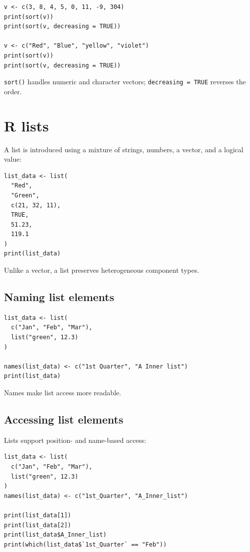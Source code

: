 \begin{lstlisting}[style=dsr]
v <- c(3, 8, 4, 5, 0, 11, -9, 304)
print(sort(v))
print(sort(v, decreasing = TRUE))

v <- c("Red", "Blue", "yellow", "violet")
print(sort(v))
print(sort(v, decreasing = TRUE))
\end{lstlisting}

\texttt{sort()} handles numeric and character vectors; \texttt{decreasing = TRUE} reverses the order.

\section{R lists}

A list is introduced using a mixture of strings, numbers, a vector, and a logical value:

\begin{lstlisting}[style=dsr]
list_data <- list(
  "Red",
  "Green",
  c(21, 32, 11),
  TRUE,
  51.23,
  119.1
)
print(list_data)
\end{lstlisting}

Unlike a vector, a list preserves heterogeneous component types.

\subsection{Naming list elements}

\begin{lstlisting}[style=dsr]
list_data <- list(
  c("Jan", "Feb", "Mar"),
  list("green", 12.3)
)

names(list_data) <- c("1st Quarter", "A Inner list")
print(list_data)
\end{lstlisting}

Names make list access more readable.

\subsection{Accessing list elements}

Lists support position- and name-based access:

\begin{lstlisting}[style=dsr]
list_data <- list(
  c("Jan", "Feb", "Mar"),
  list("green", 12.3)
)
names(list_data) <- c("1st_Quarter", "A_Inner_list")

print(list_data[1])
print(list_data[2])
print(list_data$A_Inner_list)
print(which(list_data$`1st_Quarter` == "Feb"))
\end{lstlisting}


